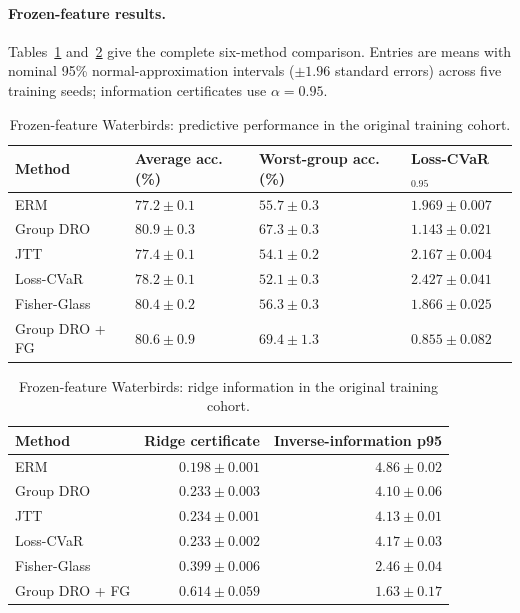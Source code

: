 \paragraph{Frozen-feature results.}
Tables~\ref{tab:e-frozen-performance} and~\ref{tab:e-frozen-information} give the complete six-method comparison. Entries are means with nominal 95\% normal-approximation intervals ($\pm1.96$ standard errors) across five training seeds; information certificates use $\alpha=0.95$.
\begin{table}[htbp]
\centering\small
\caption{Frozen-feature Waterbirds: predictive performance in the original training cohort.}
\label{tab:e-frozen-performance}
\begin{tabular}{@{}p{32mm}>{\raggedleft\arraybackslash}p{27mm}>{\raggedleft\arraybackslash}p{31mm}>{\raggedleft\arraybackslash}p{28mm}@{}}
\toprule
Method & Average acc. (\%) & Worst-group acc. (\%) & Loss-CVaR$_{0.95}$\\
\midrule
ERM & $77.2\pm0.1$ & $55.7\pm0.3$ & $1.969\pm0.007$\\
Group DRO & $80.9\pm0.3$ & $67.3\pm0.3$ & $1.143\pm0.021$\\
JTT & $77.4\pm0.1$ & $54.1\pm0.2$ & $2.167\pm0.004$\\
Loss-CVaR & $78.2\pm0.1$ & $52.1\pm0.3$ & $2.427\pm0.041$\\
Fisher-Glass & $80.4\pm0.2$ & $56.3\pm0.3$ & $1.866\pm0.025$\\
Group DRO + FG & $80.6\pm0.9$ & $69.4\pm1.3$ & $0.855\pm0.082$\\
\bottomrule
\end{tabular}
\end{table}
\begin{table}[htbp]
\centering\small
\caption{Frozen-feature Waterbirds: ridge information in the original training cohort.}
\label{tab:e-frozen-information}
\begin{tabular}{@{}lrr@{}}
\toprule
Method & Ridge certificate & Inverse-information p95\\
\midrule
ERM & $0.198\pm0.001$ & $4.86\pm0.02$\\
Group DRO & $0.233\pm0.003$ & $4.10\pm0.06$\\
JTT & $0.234\pm0.001$ & $4.13\pm0.01$\\
Loss-CVaR & $0.233\pm0.002$ & $4.17\pm0.03$\\
Fisher-Glass & $0.399\pm0.006$ & $2.46\pm0.04$\\
Group DRO + FG & $0.614\pm0.059$ & $1.63\pm0.17$\\
\bottomrule
\end{tabular}
\end{table}

